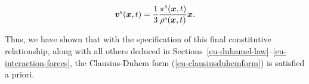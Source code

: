 \begin{equation}
\mbox{\boldmath$ v$}^{\mathrm{s}}(\mbox{\boldmath$ x$},t) = \frac{1}{3}
\frac{\pi^{\mathrm{s}}(\mbox{\boldmath$ x$},t)}{\rho^{\mathrm{s}}(\mbox{\boldmath$ x$},t)} \mbox{\boldmath$ x$}.
\end{equation}

Thus, we have shown that with the specification of this final
constitutive relationship, along with all others deduced in
Sections~\ref{eu-duhamel-law}--\ref{eu-interaction-forces}, the
Clausius-Duhem form (\ref{eu-clausiusduhemform}) is satisfied a
priori.

%

